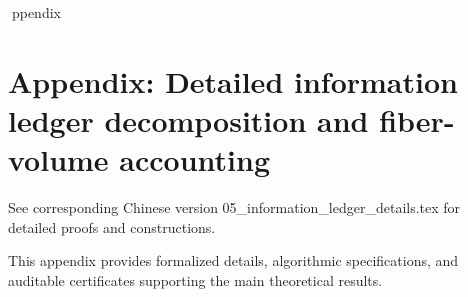 ppendix

\section*{Appendix: Detailed information ledger decomposition and fiber-volume accounting}

See corresponding Chinese version 05_information_ledger_details.tex for detailed proofs and constructions.

This appendix provides formalized details, algorithmic specifications, and auditable certificates supporting the main theoretical results.

